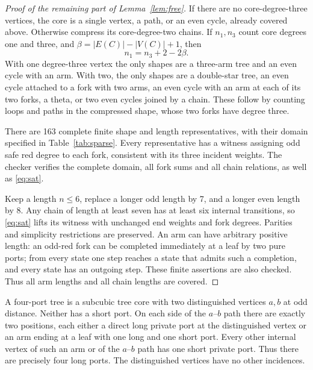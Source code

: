 \begin{proof}[Proof of the remaining part of Lemma~\ref{lem:free}]
If there are no core-degree-three vertices, the core is a single vertex,
a path, or an even cycle, already covered above.  Otherwise compress its
core-degree-two chains.  If $n_1,n_3$ count core degrees one and three,
and $\beta=|E(C)|-|V(C)|+1$, then
\begin{equation}\label{eq:euler}
 n_1=n_3+2-2\beta.
\end{equation}
With one degree-three vertex the only shapes are a three-arm tree and
an even cycle with an arm.  With two, the only shapes are a double-star
tree, an even cycle attached to a fork with two arms, an even cycle with
an arm at each of its two forks, a theta, or two even cycles joined by
a chain.  These follow by counting loops and paths in the compressed
shape, whose two forks have degree three.

There are 163 complete finite shape and length representatives, with
their domain specified in Table~\ref{tab:sparse}.  Every representative
has a witness assigning odd safe red degree to each fork, consistent
with its three incident weights.  The checker
 verifies the complete domain,
all fork sums and all chain relations, as well as \eqref{eq:sat}.

Keep a length $n\le6$, replace a longer odd length by 7, and a longer
even length by 8.  Any chain of length at least seven has at least six
internal transitions, so \eqref{eq:sat} lifts its witness with unchanged
end weights and fork degrees.  Parities and simplicity restrictions
are preserved.  An arm can have arbitrary positive length: an odd-red
fork can be completed immediately at a leaf by two pure ports; from
every state one step reaches a state that admits such a completion,
and every state has an outgoing step.  These finite assertions are also
checked.  Thus all arm lengths and all chain lengths are covered.
\end{proof}

\begin{definition}\label{def:four}
A four-port tree is a subcubic tree core with two distinguished vertices
$a,b$ at odd distance.  Neither has a short port.  On each side of the
$a$--$b$ path there are exactly two positions, each either a direct long
private port at the distinguished vertex or an arm ending at a leaf
with one long and one short port.  Every other internal vertex of such
an arm or of the $a$--$b$ path has one short private port.  Thus there
are precisely four long ports.  The distinguished vertices have no
other incidences.
\end{definition}

